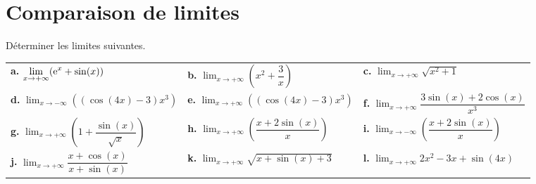 \documentclass[11pt,fleqn, openany]{book} %
\begin{document}
\section*{Comparaison de limites}

\begin{exercise}Déterminer les limites suivantes.

\renewcommand{\arraystretch}{1.5}
\begin{tabularx}{\linewidth}{XXX}
 \textbf{a.} $\displaystyle \lim_{x \to +\infty} (\mathrm{e}^x + \sin(x))$ &
 \textbf{b.} $\displaystyle \lim_{x \to +\infty} \left(x^2+\dfrac{3}{x}\right)$ &
  \textbf{c.} $\displaystyle \lim_{x \to +\infty} \sqrt{x^2+1}$ \\
 \textbf{d.} $\displaystyle \lim_{x \to -\infty} \left((\cos(4x)-3)x^3\right)$ & 
 \textbf{e.} $\displaystyle \lim_{x \to +\infty} \left((\cos(4x)-3)x^3\right)$ &
 \textbf{f.}  $\displaystyle \lim_{x \to +\infty} \dfrac{3\sin(x)+2 \cos(x)}{x^3}$ \\
 \textbf{g.} $\displaystyle \lim_{x \to +\infty} \left(1+\dfrac{\sin (x)}{\sqrt{x}}\right)$ &
  \textbf{h.} $\displaystyle \lim_{x \to +\infty} \left( \dfrac{x+2\sin(x)}{x}\right)$ & 
 \textbf{i.} $\displaystyle \lim_{x \to -\infty} \left(\dfrac{x+2\sin (x)}{x}\right)$ \\
  \textbf{j.} $\displaystyle \lim_{x \to +\infty} \dfrac{x+\cos(x)}{x+\sin(x)}$ &
 \textbf{k.} $\displaystyle \lim_{x \to +\infty}\sqrt{x+\sin(x)+3}$ & 
 \textbf{l.} $\displaystyle \lim_{x \to +\infty}2x^2-3x+\sin(4x)$
\end{tabularx}\end{exercise}
\end{document}

